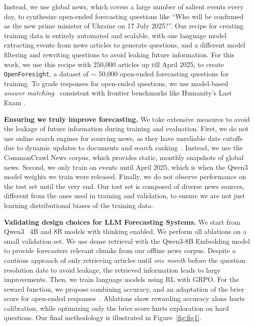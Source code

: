 \documentclass{article} %
\newcommand{\ourdataset}{\texttt{OpenForesight}}
\begin{document}
 Instead, we use global news, which covers a large number of salient events every day, to synthesize open-ended forecasting questions like ``Who will be confirmed as the new prime minister of Ukraine on 17 July 2025?''. Our recipe for creating training data is entirely automated and scalable, with one language model extracting events from news articles to generate questions, and a different model filtering and rewriting questions to avoid leaking future information. For this work, we use this recipe with 250,000 articles up till April 2025, to create \ourdataset, a dataset of $\sim$ 50,000 open-ended forecasting questions for training. To grade responses for open-ended questions, we use model-based \emph{answer matching}~\citep{chandak2025answer} consistent with frontier benchmarks like Humanity's Last Exam \citep{phan2025humanity}. \vspace{0.15cm}

\textbf{Ensuring we truly improve forecasting.} We take extensive measures to avoid the leakage of future information during training and evaluation. First, we do not use online search engines for sourcing news, as they have unreliable date cutoffs due to dynamic updates to documents and search ranking~\citep{paleka2025pitfalls}. Instead, we use the CommonCrawl News corpus, which provides static, monthly snapshots of global news. Second, we only train on events until April 2025, which is when the Qwen3 model weights we train were released. Finally, we do not observe performance on the test set until the very end. Our test set is composed of diverse news sources, different from the ones used in training and validation, to ensure we are not just learning distributional biases of the training data.\vspace{0.15cm}

\textbf{Validating design choices for LLM Forecasting Systems.} We start from Qwen3~\citep{yang2025qwen3technicalreport} 4B and 8B models with thinking enabled. We perform all ablations on a small validation set. We use dense retrieval with the Qwen3-8B Embedding model to provide forecasters relevant chunks from our offline news corpus. Despite a cautious approach of only retrieving articles until \emph{one month} before the question resolution date to avoid leakage, the retrieved information leads to large improvements. Then, we train language models using RL with GRPO. For the reward function, we propose combining accuracy, and an adaptation of the brier score for open-ended responses~\citep{damani2025beyond}. Ablations show rewarding accuracy alone hurts calibration, while optimizing only the brier score hurts exploration on hard questions. Our final methodology is illustrated in Figure~\ref{fig:fig1}. \vspace{0.15cm}
\end{document}
